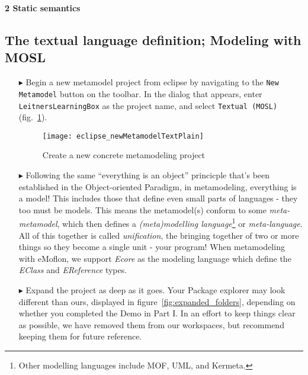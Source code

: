 \newpage
\texHeader

{\bf \Large 2 \hspace{0.5cm}Static semantics}

\subsection{The textual language definition; Modeling with MOSL}
\label{sec:staticConcrete}

\begin{itemize}

\item[$\blacktriangleright$] \hypertarget{static tex}{Begin a} new metamodel project from eclipse by navigating to the \texttt{New Metamodel} button on the toolbar. In the dialog that appears, enter \texttt{LeitnersLearningBox} as the project name, and select \texttt{Textual (MOSL)}  (fig.~\ref{fig:new_project}).

\begin{figure}[htbp]
	\centering
  \texttt{[image: eclipse\_newMetamodelTextPlain]}
	\caption{Create a new concrete metamodeling project}
	\label{fig:new_project}
\end{figure}

\item[$\blacktriangleright$] Following 
 the same ``everything is an object'' princicple that's been established in the Object-oriented Paradigm, in metamodeling, everything is a model! This
  includes those that define even small parts of languages - they too must be models. This means the metamodel(s) conform to some \emph{meta-metamodel}, 
which then defines a \emph{(meta)modelling language}\footnote{Other modelling languages include MOF, UML, and Kermeta.} or \emph{meta-language}. All of this together is called \emph{unification}, the bringing together of two or more things so they become a single unit - your program! When metamodeling with eMoflon, we support \emph{Ecore} as the modeling language which define the \emph{EClass} and \emph{EReference} types.

\item[$\blacktriangleright$] Expand the project as deep as it goes. Your Package explorer may look different than ours, displayed in figure~\ref{fig:expanded_folders}, depending on whether you completed the Demo in Part I. In an effort to keep things clear as possible, we have removed them from our workspaces, but recommend keeping them for future reference.


\end{itemize}
